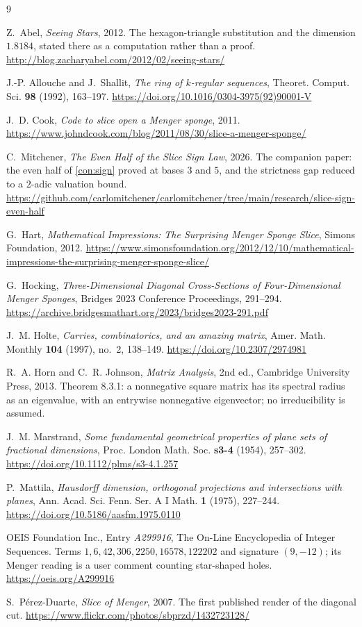 \documentclass[11pt]{amsart}
\theoremstyle{definition}
\theoremstyle{remark}
\begin{document}
\begin{thebibliography}{9}

Z.~Abel, \emph{Seeing Stars}, 2012. The hexagon-triangle substitution and the dimension $1.8184$, stated there as a computation rather than a proof. \url{http://blog.zacharyabel.com/2012/02/seeing-stars/}

J.-P. Allouche and J.~Shallit, \emph{The ring of $k$-regular sequences}, Theoret. Comput. Sci. \textbf{98} (1992), 163--197. \url{https://doi.org/10.1016/0304-3975(92)90001-V}

J.~D. Cook, \emph{Code to slice open a Menger sponge}, 2011. \url{https://www.johndcook.com/blog/2011/08/30/slice-a-menger-sponge/}

C.~Mitchener, \emph{The Even Half of the Slice Sign Law}, 2026. The companion paper: the even half of \cref{con:sign} proved at bases $3$ and $5$, and the strictness gap reduced to a $2$-adic valuation bound. \url{https://github.com/carlomitchener/carlomitchener/tree/main/research/slice-sign-even-half}

G.~Hart, \emph{Mathematical Impressions: The Surprising Menger Sponge Slice}, Simons Foundation, 2012. \url{https://www.simonsfoundation.org/2012/12/10/mathematical-impressions-the-surprising-menger-sponge-slice/}

G.~Hocking, \emph{Three-Dimensional Diagonal Cross-Sections of Four-Dimensional Menger Sponges}, Bridges 2023 Conference Proceedings, 291--294. \url{https://archive.bridgesmathart.org/2023/bridges2023-291.pdf}

J.~M. Holte, \emph{Carries, combinatorics, and an amazing matrix}, Amer. Math. Monthly \textbf{104} (1997), no.~2, 138--149. \url{https://doi.org/10.2307/2974981}

R.~A. Horn and C.~R. Johnson, \emph{Matrix Analysis}, 2nd ed., Cambridge University Press, 2013. Theorem 8.3.1: a nonnegative square matrix has its spectral radius as an eigenvalue, with an entrywise nonnegative eigenvector; no irreducibility is assumed.

J.~M. Marstrand, \emph{Some fundamental geometrical properties of plane sets of fractional dimensions}, Proc. London Math. Soc. \textbf{s3-4} (1954), 257--302. \url{https://doi.org/10.1112/plms/s3-4.1.257}

P.~Mattila, \emph{Hausdorff dimension, orthogonal projections and intersections with planes}, Ann. Acad. Sci. Fenn. Ser. A I Math. \textbf{1} (1975), 227--244. \url{https://doi.org/10.5186/aasfm.1975.0110}

OEIS Foundation Inc., Entry \emph{A299916}, The On-Line Encyclopedia of Integer Sequences. Terms $1, 6, 42, 306, 2250, 16578, 122202$ and signature $(9,-12)$; its Menger reading is a user comment counting star-shaped holes. \url{https://oeis.org/A299916}

S.~P\'erez-Duarte, \emph{Slice of Menger}, 2007. The first published render of the diagonal cut. \url{https://www.flickr.com/photos/sbprzd/1432723128/}

\end{thebibliography}
\end{document}
